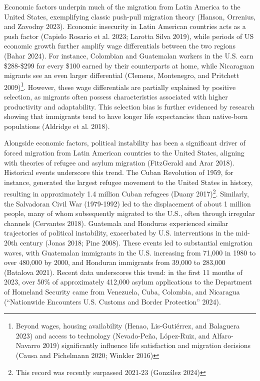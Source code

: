 \documentclass[
]{article}
\begin{document}
Economic factors underpin much of the migration from Latin America to
the United States, exemplifying classic push-pull migration theory
(Hanson, Orrenius, and Zavodny 2023). Economic insecurity in Latin
American countries acts as a push factor (Capielo Rosario et al. 2023;
Larotta Silva 2019), while periods of US economic growth further amplify
wage differentials between the two regions (Bahar 2024). For instance,
Colombian and Guatemalan workers in the U.S. earn \$288-\$299 for every
\$100 earned by their counterparts at home, while Nicaraguan migrants
see an even larger differential (Clemens, Montenegro, and Pritchett
2009)\footnote{Beyond wages, housing availability (Henao, Lis-Gutiérrez,
  and Balaguera 2023) and access to technology (Nevado-Peña, López-Ruiz,
  and Alfaro-Navarro 2019) significantly influence life satisfaction and
  migration decisions (Causa and Pichelmann 2020; Winkler 2016)}.
However, these wage differentials are partially explained by positive
selection, as migrants often possess characteristics associated with
higher productivity and adaptability. This selection bias is further
evidenced by research showing that immigrants tend to have longer life
expectancies than native-born populations (Aldridge et al. 2018).

Alongside economic factors, political instability has been a significant
driver of forced migration from Latin American countries to the United
States, aligning with theories of refugee and asylum migration
(FitzGerald and Arar 2018). Historical events underscore this trend. The
Cuban Revolution of 1959, for instance, generated the largest refugee
movement to the United States in history, resulting in approximately 1.4
million Cuban refugees (Duany 2017)\footnote{This record was recently
  surpassed 2021-23 (González 2024)}. Similarly, the Salvadoran Civil
War (1979-1992) led to the displacement of about 1 million people, many
of whom subsequently migrated to the U.S., often through irregular
channels (Cervantes 2018). Guatemala and Honduras experienced similar
trajectories of political instability, exacerbated by U.S. interventions
in the mid-20th century (Jonas 2018; Pine 2008). These events led to
substantial emigration waves, with Guatemalan immigrants in the U.S.
increasing from 71,000 in 1980 to over 480,000 by 2000, and Honduran
immigrants from 39,000 to 283,000 (Batalova 2021). Recent data
underscores this trend: in the first 11 months of 2023, over 50\% of
approximately 412,000 asylum applications to the Department of Homeland
Security came from Venezuela, Cuba, Colombia, and Nicaragua
({``Nationwide {Encounters} {\textbar} {U}.{S}. {Customs} and {Border}
{Protection}''} 2024).
\end{document}

